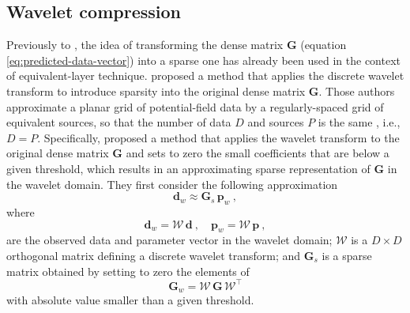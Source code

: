 \subsection{Wavelet compression}

Previously to \cite{barnes-lumley2011}, the idea of transforming the dense matrix $\mathbf{G}$ (equation \ref{eq:predicted-data-vector}) 
into a sparse one has already been used in the context of equivalent-layer technique.
\cite{li-oldenburg2010} proposed a method that applies the discrete wavelet transform to introduce sparsity into 
the original dense matrix $\mathbf{G}$.
Those authors approximate a planar grid of potential-field data by a regularly-spaced grid of equivalent sources,
so that the number of data $D$ and sources $P$ is the same , i.e., $D = P$.
Specifically, \cite{li-oldenburg2010} proposed a method that applies the wavelet transform to the original dense 
matrix $\mathbf{G}$ and sets to zero the small coefficients that are below a given threshold, which results in an 
approximating sparse representation of $\mathbf{G}$ in the wavelet domain.
They first consider the following approximation
\begin{equation}
	\mathbf{d}_{w} \approx \mathbf{G}_{s} \, \mathbf{p}_{w} \: ,
	\label{eq:approximated-linear-system-wavelet-domain}
\end{equation}
where 
\begin{equation}
	\mathbf{d}_{w} = \boldsymbol{\mathcal{W}} \, \mathbf{d} \: , \quad 
	\mathbf{p}_{w} = \boldsymbol{\mathcal{W}} \, \mathbf{p} \: ,
	\label{eq:vectors-dw-pw}
\end{equation}
are the observed data and parameter vector in the wavelet domain; $\boldsymbol{\mathcal{W}}$ is a $D \times D$ orthogonal matrix defining a 
discrete wavelet transform; and $\mathbf{G}_{s}$ is a sparse matrix obtained by setting to zero the elements of
\begin{equation}
	\mathbf{G}_{w} = \boldsymbol{\mathcal{W}} \, \mathbf{G} \, \boldsymbol{\mathcal{W}}^{\top}
	\label{eq:matrix-Gw}
\end{equation}
with absolute value smaller than a given threshold.


